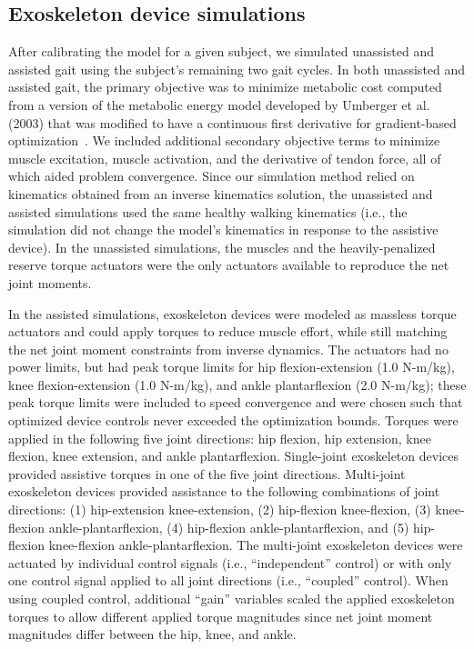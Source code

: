 \documentclass[10pt,letterpaper]{article}
\begin{document}
\subsection*{Exoskeleton device simulations}
After calibrating the model for a given subject, we simulated unassisted and assisted gait using the subject’s remaining two gait cycles. In both unassisted and assisted gait, the primary objective was to minimize metabolic cost computed from a version of the metabolic energy model developed by Umberger et al. (2003) that was modified to have a continuous first derivative for gradient-based optimization~\cite{Umberger:2003, Koelewijn:2018}. We included additional secondary objective terms to minimize muscle excitation, muscle activation, and the derivative of tendon force, all of which aided problem convergence. Since our simulation method relied on kinematics obtained from an inverse kinematics solution, the unassisted and assisted simulations used the same healthy walking kinematics (i.e., the simulation did not change the model's kinematics in response to the assistive device). In the unassisted simulations, the muscles and the heavily-penalized reserve torque actuators were the only actuators available to reproduce the net joint moments.
 
In the assisted simulations, exoskeleton devices were modeled as massless torque actuators and could apply torques to reduce muscle effort, while still matching the net joint moment constraints from inverse dynamics. The actuators had no power limits, but had peak torque limits for hip flexion-extension (1.0 N-m/kg), knee flexion-extension (1.0 N-m/kg), and ankle plantarflexion (2.0 N-m/kg); these peak torque limits were included to speed convergence and were chosen such that optimized device controls never exceeded the optimization bounds. Torques were applied in the following five joint directions: hip flexion, hip extension, knee flexion, knee extension, and ankle plantarflexion. Single-joint exoskeleton devices provided assistive torques in one of the five joint directions. Multi-joint exoskeleton devices provided assistance to the following combinations of joint directions: (1) hip-extension knee-extension, (2) hip-flexion knee-flexion, (3) knee-flexion ankle-plantarflexion, (4) hip-flexion ankle-plantarflexion, and (5) hip-flexion knee-flexion ankle-plantarflexion. The multi-joint exoskeleton devices were actuated by individual control signals (i.e., ``independent'' control) or with only one control signal applied to all joint directions (i.e., ``coupled'' control). When using coupled control, additional ``gain'' variables scaled the applied exoskeleton torques to allow different applied torque magnitudes since net joint moment magnitudes differ between the hip, knee, and ankle.
 
\end{document}
